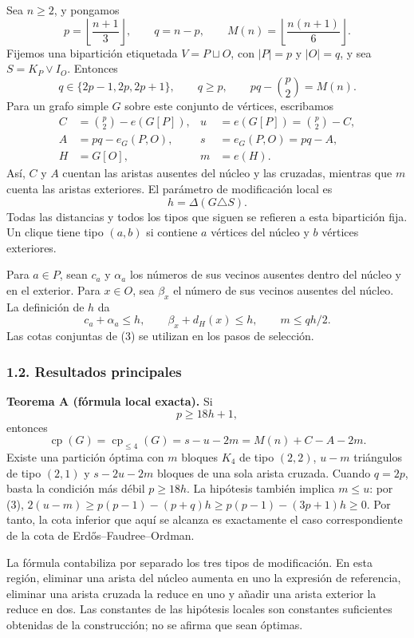 \documentclass[spanish,11pt,a4paper]{article}
\begin{document}
Sea \(n\ge2\), y pongamos \[
p=\left\lfloor\frac{n+1}{3}\right\rfloor,\qquad
q=n-p,\qquad M(n)=\left\lfloor\frac{n(n+1)}6\right\rfloor.
\] Fijemos una bipartición etiquetada \(V=P\sqcup O\), con \(|P|=p\) y
\(|O|=q\), y sea \(S=K_P\vee I_O\). Entonces \[
q\in\{2p-1,2p,2p+1\},\qquad q\ge p,\qquad
pq-\binom p2=M(n). \tag{1}
\] Para un grafo simple \(G\) sobre este conjunto de vértices,
escribamos \[
\begin{aligned}
C&=\binom p2-e(G[P]), &u&=e(G[P])=\binom p2-C,\\
A&=pq-e_G(P,O), &s&=e_G(P,O)=pq-A,\\
H&=G[O], &m&=e(H).
\end{aligned}
\] Así, \(C\) y \(A\) cuentan las aristas ausentes del núcleo y las
cruzadas, mientras que \(m\) cuenta las aristas exteriores. El parámetro
de modificación local es \[
h=\Delta(G\triangle S). \tag{2}
\] Todas las distancias y todos los tipos que siguen se refieren a esta
bipartición fija. Un clique tiene tipo \((a,b)\) si contiene \(a\)
vértices del núcleo y \(b\) vértices exteriores.

Para \(a\in P\), sean \(c_a\) y \(\alpha_a\) los números de sus vecinos
ausentes dentro del núcleo y en el exterior. Para \(x\in O\), sea
\(\beta_x\) el número de sus vecinos ausentes del núcleo. La definición
de \(h\) da \[
c_a+\alpha_a\le h,\qquad \beta_x+d_H(x)\le h,
\qquad m\le qh/2. \tag{3}
\] Las cotas conjuntas de (3) se utilizan en los pasos de selección.

\subsubsection{1.2. Resultados
principales}\label{resultados-principales}

\textbf{Teorema A (fórmula local exacta).} Si \[
p\ge18h+1, \tag{4}
\] entonces \[
\operatorname{cp}(G)=\operatorname{cp}_{\le4}(G)
=s-u-2m=M(n)+C-A-2m. \tag{5}
\] Existe una partición óptima con \(m\) bloques \(K_4\) de tipo
\((2,2)\), \(u-m\) triángulos de tipo \((2,1)\) y \(s-2u-2m\) bloques de
una sola arista cruzada. Cuando \(q=2p\), basta la condición más débil
\(p\ge18h\). La hipótesis también implica \(m\le u\): por (3),
\(2(u-m)\ge p(p-1)-(p+q)h\ge p(p-1)-(3p+1)h\ge0\). Por tanto, la cota
inferior que aquí se alcanza es exactamente el caso correspondiente de
la cota de Erdős--Faudree--Ordman.

La fórmula contabiliza por separado los tres tipos de modificación. En
esta región, eliminar una arista del núcleo aumenta en uno la expresión
de referencia, eliminar una arista cruzada la reduce en uno y añadir una
arista exterior la reduce en dos. Las constantes de las hipótesis
locales son constantes suficientes obtenidas de la construcción; no se
afirma que sean óptimas.
\end{document}

